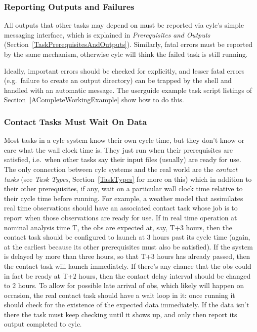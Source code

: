 \documentclass[11pt,a4paper]{article}
\begin{document}
\subsubsection{Reporting Outputs and Failures}

All outputs that other tasks may depend on must be reported via cylc's
simple messaging interface, which is explained in {\em Prerequisites and
Outputs} (Section~\ref{TaskPrerequisitesAndOutputs}). Similarly, fatal
errors must be reported by the same mechanism, otherwise cylc will think
the failed task is still running. 

Ideally, important errors should be checked for explicitly, and lesser
fatal errors (e.g.\ failure to create an output directory) can be
trapped by the shell and handled with an automatic message. The
userguide example task script listings of
Section~\ref{ACompleteWorkingExample} show how to do this.

\subsubsection{Contact Tasks Must Wait On Data}

Most tasks in a cylc system know their own cycle time, but they don't
know or care what the wall clock time is.  They just run when their
prerequisites are satisfied, i.e.\  when other tasks say their input
files (usually) are ready for use. The only connection between cylc
systems and the real world are the {\em contact tasks} (see {\em Task
Types}, Section~\ref{TaskTypes} for more on this) which in addition to
their other prerequisites, if any, wait on a particular wall clock time
relative to their cycle time before running.  For example, a weather
model that assimilates real time observations should have an associated
contact task whose job is to report when those observations are ready
for use.  If in real time operation at nominal analysis time T, the obs
are expected at, say, T+3 hours, then the contact task should be
configured to launch at 3 hours past its cycle time (again, at the
earliest because its other prerequisites must also be satisfied).
If the system is delayed by more than three hours, so that T+3 hours 
has already passed, then the contact task will launch immediately.
If there's any chance that the obs could in fact be ready at T+2 hours,
then the contact delay interval should be changed to 2 hours.  To allow
for possible late arrival of obs, which likely will happen on occasion,
the real contact task should have a wait loop in it: once running it
should check for the existence of the expected data immediately. If the
data isn't there the task must keep checking until it shows up, and only then
report its output completed to cylc. 
\end{document}
